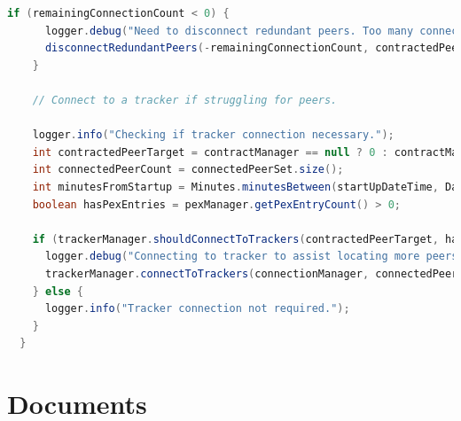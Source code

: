 \documentclass[11pt, a4paper, twocolumn, twoside]{report}
\begin{document}
\begin{lstlisting}[language=Java, caption=Peer Population Control, label=lst:peerPop]
    if (remainingConnectionCount < 0) {
      logger.debug("Need to disconnect redundant peers. Too many connections.");
      disconnectRedundantPeers(-remainingConnectionCount, contractedPeers, connectedPeerSet);
    }

    // Connect to a tracker if struggling for peers.

    logger.info("Checking if tracker connection necessary.");
    int contractedPeerTarget = contractManager == null ? 0 : contractManager.getContractCountTarget();
    int connectedPeerCount = connectedPeerSet.size();
    int minutesFromStartup = Minutes.minutesBetween(startUpDateTime, DateTime.now()).getMinutes();
    boolean hasPexEntries = pexManager.getPexEntryCount() > 0;

    if (trackerManager.shouldConnectToTrackers(contractedPeerTarget, hasPexEntries, minutesFromStartup, connectedPeerCount)) {
      logger.debug("Connecting to tracker to assist locating more peers.");
      trackerManager.connectToTrackers(connectionManager, connectedPeers);
    } else {
      logger.info("Tracker connection not required.");
    }
  }
\end{lstlisting}

\section{Documents}
\end{document}
